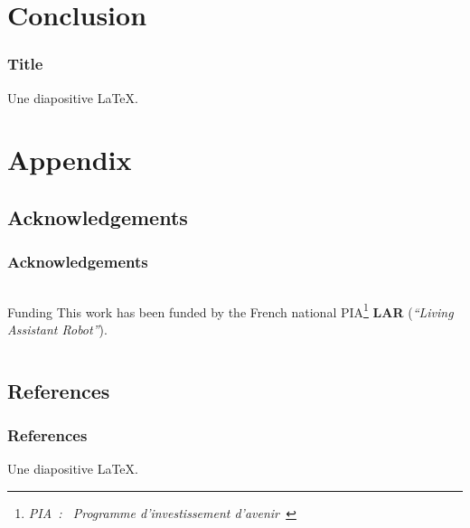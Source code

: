 \documentclass[10pt,c]{beamer}
\begin{document}
\section{Conclusion}

\begin{frame}
\frametitle{Title}
Une diapositive \LaTeX.
\end{frame}


\appendix


\section{Appendix}

\subsection{Acknowledgements}

\begin{frame}
\frametitle{Acknowledgements}
\begin{columns}[c]
\begin{column}{8.25cm}
\begin{block}{Funding}
This work has been funded by the French national PIA\footnote{\textsl{PIA~:
\guillemotleft~Programme d'investissement d'avenir~\guillemotright}}
\textbf{LAR} (\textit{``Living Assistant Robot''}).
\end{block}
\end{column}
\end{columns}
\end{frame}

\subsection{References}

\begin{frame}
\frametitle{References}
Une diapositive \LaTeX.
\end{frame}


\end{document}
